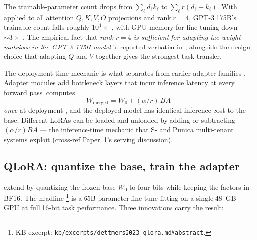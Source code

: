 The trainable-parameter count drops from $\sum_\ell d_\ell k_\ell$ to
$\sum_\ell r(d_\ell + k_\ell)$. With  applied to all attention
$Q, K, V, O$ projections and rank $r = 4$, GPT-3 175B's trainable count
falls roughly $10^{4}\times$ \citep[\S 3]{hu2021-lora}, with GPU memory
for fine-tuning down $\sim\!3\times$ \citep[abstract]{hu2021-lora}. The
empirical fact that \emph{rank $r = 4$ is sufficient for adapting the
weight matrices in the GPT-3 175B model} is reported verbatim in
\citet[\S 4]{hu2021-lora}, alongside the design choice that adapting
$Q$ and $V$ together gives the strongest task transfer.

The deployment-time mechanic is what separates  from earlier
adapter families \citep{houlsby2019-adapters}. Adapter modules add bottleneck layers that incur inference
latency at every forward pass;  computes
\begin{equation}
W_{\text{merged}} = W_0 + (\alpha / r)\, B A
\label{eq:lora-merge}
\end{equation}
\emph{once} at deployment \citep[\S 5]{hu2021-lora}, and the deployed
model has identical inference cost to the base. Different LoRAs can be
loaded and unloaded by adding or subtracting $(\alpha/r) B A$ — the
inference-time mechanic that S- and Punica multi-tenant systems
exploit (cross-ref Paper~1's serving discussion).

\subsection{QLoRA: quantize the base, train the adapter}
\label{sec:adapt-qlora}

\citet{dettmers2023-qlora} extend  by quantizing the frozen base
$W_0$ to four bits while keeping the  factors in BF16. The headline
\citep[abstract]{dettmers2023-qlora}\footnote{KB excerpt:
\texttt{kb/excerpts/dettmers2023-qlora.md\#abstract}.} is a 65B-parameter
fine-tune fitting on a single 48~GB GPU at full 16-bit task
performance. Three innovations carry the result:

